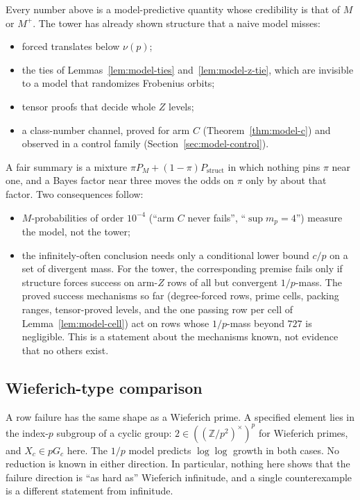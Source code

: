 Every number above is a model-predictive quantity whose credibility is that
of $M$ or $M^+$.  The tower has already shown structure that a naive model
misses:
\begin{itemize}
\item forced translates below $\nu(p)$;
\item the ties of Lemmas~\ref{lem:model-ties} and~\ref{lem:model-z-tie},
      which are invisible to a model that randomizes Frobenius orbits;
\item tensor proofs that decide whole $Z$ levels;
\item a class-number channel, proved for arm $C$
      (Theorem~\ref{thm:model-c}) and observed in a control family
      (Section~\ref{sec:model-control}).
\end{itemize}
A fair summary is a mixture
$\pi P_M+(1-\pi)P_{\mathrm{struct}}$ in which nothing pins $\pi$ near one,
and a Bayes factor near three moves the odds on $\pi$ only by about that
factor.  Two consequences follow:
\begin{itemize}
\item $M$-probabilities of order $10^{-4}$ (``arm $C$ never fails'',
      ``$\sup m_p=4$'') measure the model, not the tower;
\item the infinitely-often conclusion needs only a conditional lower bound
      $c/p$ on a set of divergent mass.  For the tower, the corresponding
      premise fails only if structure forces success on arm-$Z$ rows of all
      but convergent $1/p$-mass.  The proved success mechanisms so far
      (degree-forced rows, prime cells, packing ranges, tensor-proved levels,
      and the one passing row per cell of Lemma~\ref{lem:model-cell}) act on
      rows whose $1/p$-mass beyond $727$ is negligible.  This is a statement
      about the mechanisms known, not evidence that no others exist.
\end{itemize}

\subsection{Wieferich-type comparison}\label{sec:model-wieferich}

A row failure has the same shape as a Wieferich prime.  A specified element
lies in the index-$p$ subgroup of a cyclic group:
$2\in((\mathbb Z/p^2)^{\times})^p$ for Wieferich primes, and $X_c\in pG_c$
here.  The $1/p$ model predicts $\log\log$ growth in both cases.  No
reduction is known in either direction.  In particular, nothing here shows
that the failure direction is ``as hard as'' Wieferich infinitude, and a
single counterexample is a different statement from infinitude.

